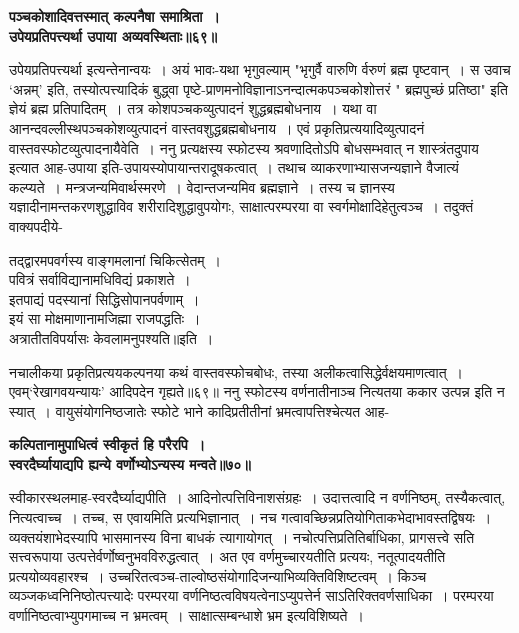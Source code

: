 {{{{\begin{center}{\bfseries पञ्चकोशादिवत्तस्मात् कल्पनैषा समाश्रिता~।\\
उपेयप्रतिपत्त्यर्था उपाया अव्यवस्थिताः॥६९॥}\end{center}
 उपेयप्रतिपत्त्यर्था इत्यन्तेनान्वयः~।
अयं भावः-यथा भृगुवल्याम् "भृगुर्वै वारुणि र्वरुणं ब्रह्म पृष्टवान्~।
स उवाच `अन्नम्' इति, तस्योत्पत्त्यादिकं बुद्ध्वा पृष्टे-प्राणमनोविज्ञानाऽनन्दात्मकपञ्चकोशोत्तरं " ब्रह्मपुच्छं प्रतिष्ठा" इति ज्ञेयं ब्रह्म प्रतिपादितम्~।
तत्र कोशपञ्चकव्युत्पादनं शुद्धब्रह्मबोधनाय~।
यथा वा आनन्दवल्लीस्थपञ्चकोशव्युत्पादनं वास्तवशुद्धब्रह्मबोधनाय~।
एवं प्रकृतिप्रत्ययादिव्युत्पादनं वास्तवस्फोटव्युत्पादनायैवेति~।
ननु प्रत्यक्षस्य स्फोटस्य श्रवणादितोऽपि बोधसम्भवात् न शास्त्रंतदुपाय इत्यात आह-उपाया इति-उपायस्योपायान्तरादूषकत्वात्~।
तथाच व्याकरणाभ्यासजन्यज्ञाने वैजात्यं कल्प्यते~।
मन्त्रजन्यमिवार्थस्मरणे~।
वेदान्तजन्यमिव ब्रह्मज्ञाने~।
तस्य च ज्ञानस्य यज्ञादीनामन्तकरणशुद्धाविव शरीरादिशुद्धावुपयोगः, साक्षात्परम्परया वा स्वर्गमोक्षादिहेतुत्वञ्च~।
तदुक्तं वाक्यपदीये-
\begin{center}तद्द्वारमपवर्गस्य वाङ्गमलानां चिकित्सेतम्~।\\
पवित्रं सर्वाविद्यानामधिविद्यं प्रकाशते~।\\[10pt]
इतपाद्यं पदस्यानां सिद्धिसोपानपर्वणाम्~।\\
इयं सा मोक्षमाणानामजिह्मा राजपद्धतिः~।\\[10pt]
अत्रातीतविपर्यासः केवलामनुपश्यति॥इति~।\end{center}
 नचालीकया प्रकृतिप्रत्ययकल्पनया कथं वास्तवस्फोचबोधः, तस्या अलीकत्वासिद्धेर्वक्षयमाणत्वात्~।
एवम्`रेखागवयन्यायः' आदिपदेन गृह्यते॥६९॥
 ननु स्फोटस्य वर्णनातीनाञ्च नित्यतया ककार उत्पन्न इति न स्यात्~।
वायुसंयोगनिष्ठजातेः स्फोटे भाने कादिप्रतीतीनां भ्रमत्वापत्तिश्चेत्यत आह-
\begin{center}{\bfseries कल्पितानामुपाधित्वं स्वीकृतं हि परैरपि~।\\
स्वरदैर्घ्यायाद्यपि ह्यन्ये वर्णोभ्योऽन्यस्य मन्वते॥७०॥}\end{center}
 स्वीकारस्थलमाह-स्वरदैर्घ्याद्यपीति~।
आदिनोत्पत्तिविनाशसंग्रहः~।
उदात्तत्वादि न वर्णनिष्ठम्, तस्यैकत्वात्, नित्यत्वाच्च~।
तच्च, स एवायमिति प्रत्यभिज्ञानात्~।
नच गत्वावच्छिन्नप्रतियोगिताकभेदाभावस्तद्विषयः~।
व्यक्तयंशाभेदस्यापि भासमानस्य विना बाधकं त्यागायोगत्~।
नचोत्पत्तिप्रतितिर्बाधिका, प्रागसत्त्वे सति सत्त्वरूपाया उत्पत्तेर्वर्णोष्वनुभवविरुद्धत्वात्~।
अत एव वर्णमुच्चारयतीति प्रत्ययः, नतूत्पादयतीति प्रत्ययोव्यवहारश्च~।
उच्चरितत्वञ्च-ताल्वोष्ठसंयोगादिजन्याभिव्यक्तिविशिष्टत्वम्~।
किञ्च व्यञ्जकध्वनिनिष्ठोत्पत्त्यादेः परम्परया वर्णनिष्ठत्वविषयत्वेनाऽप्युपत्तेर्न साऽतिरिक्तवर्णसाधिका~।
परम्परया वर्णानिष्ठत्वाभ्युपगमाच्च न भ्रमत्वम्~।
साक्षात्सम्बन्धाशे भ्रम इत्यविशिष्यते~।
 
}}}}
